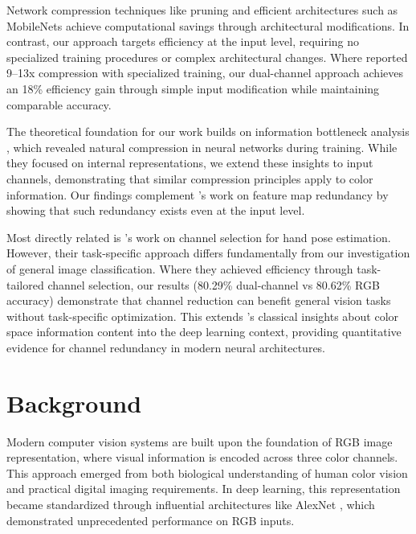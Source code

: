 \documentclass{article} %
\begin{document}
Network compression techniques like pruning \citep{Han2015DeepCC} and efficient architectures such as MobileNets \citep{Howard2017MobileNetsEC} achieve computational savings through architectural modifications. In contrast, our approach targets efficiency at the input level, requiring no specialized training procedures or complex architectural changes. Where \citet{Han2015DeepCC} reported 9--13x compression with specialized training, our dual-channel approach achieves an 18\% efficiency gain through simple input modification while maintaining comparable accuracy.

The theoretical foundation for our work builds on information bottleneck analysis \citep{Shwartz-Ziv2017OpeningTB}, which revealed natural compression in neural networks during training. While they focused on internal representations, we extend these insights to input channels, demonstrating that similar compression principles apply to color information. Our findings complement \citet{Wang2018ExploringLR}'s work on feature map redundancy by showing that such redundancy exists even at the input level.

Most directly related is \citet{wang2018mask}'s work on channel selection for hand pose estimation. However, their task-specific approach differs fundamentally from our investigation of general image classification. Where they achieved efficiency through task-tailored channel selection, our results (80.29\% dual-channel vs 80.62\% RGB accuracy) demonstrate that channel reduction can benefit general vision tasks without task-specific optimization. This extends \citet{González2006DigitalIP}'s classical insights about color space information content into the deep learning context, providing quantitative evidence for channel redundancy in modern neural architectures.

\section{Background}
\label{sec:background}

Modern computer vision systems are built upon the foundation of RGB image representation, where visual information is encoded across three color channels. This approach emerged from both biological understanding of human color vision \citep{González2006DigitalIP} and practical digital imaging requirements. In deep learning, this representation became standardized through influential architectures like AlexNet \citep{Krizhevsky2012ImageNetCW}, which demonstrated unprecedented performance on RGB inputs.
\end{document}
